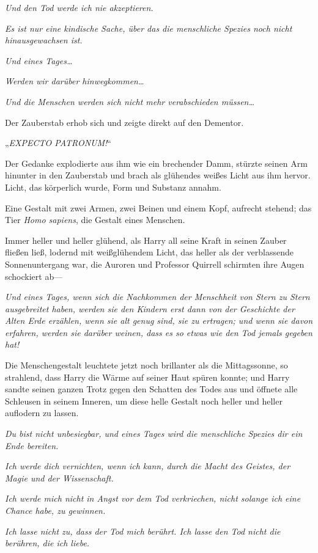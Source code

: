 {\emph{Und den Tod werde ich nie akzeptieren.}

\emph{Es ist nur eine kindische Sache, über das die menschliche Spezies noch nicht hinausgewachsen ist.}

\emph{Und eines Tages…}

\emph{Werden wir darüber hinwegkommen…}

\emph{Und die Menschen werden sich nicht mehr verabschieden müssen…}

Der Zauberstab erhob sich und zeigte direkt auf den Dementor.

„\emph{EXPECTO PATRONUM!}“

Der Gedanke explodierte aus ihm wie ein brechender Damm, stürzte seinen Arm hinunter in den Zauberstab und brach als glühendes weißes Licht aus ihm hervor. Licht, das körperlich wurde, Form und Substanz annahm.

Eine Gestalt mit zwei Armen, zwei Beinen und einem Kopf, aufrecht stehend; das Tier \emph{Homo sapiens}, die Gestalt eines Menschen.

Immer heller und heller glühend, als Harry all seine Kraft in seinen Zauber fließen ließ, lodernd mit weißglühendem Licht, das heller als der verblassende Sonnenuntergang war, die Auroren und Professor Quirrell schirmten ihre Augen schockiert ab—

\emph{Und eines Tages, wenn sich die Nachkommen der Menschheit von Stern zu Stern ausgebreitet haben, werden sie den Kindern erst dann von der Geschichte der Alten Erde erzählen, wenn sie alt genug sind, sie zu ertragen; und wenn sie davon erfahren, werden sie darüber weinen, dass es so etwas wie den Tod jemals gegeben hat!}

Die Menschengestalt leuchtete jetzt noch brillanter als die Mittagssonne, so strahlend, dass Harry die Wärme auf seiner Haut spüren konnte; und Harry sandte seinen ganzen Trotz gegen den Schatten des Todes aus und öffnete alle Schleusen in seinem Inneren, um diese helle Gestalt noch heller und heller auflodern zu lassen.

\emph{Du bist nicht unbesiegbar, und eines Tages wird die menschliche Spezies dir ein Ende bereiten.}

\emph{Ich werde dich vernichten, wenn ich kann, durch die Macht des Geistes, der Magie und der Wissenschaft.}

\emph{Ich werde mich nicht in Angst vor dem Tod verkriechen, nicht solange ich eine Chance habe, zu gewinnen.}

\emph{Ich lasse nicht zu, dass der Tod mich berührt. Ich lasse den Tod nicht die berühren, die ich liebe.}

}
